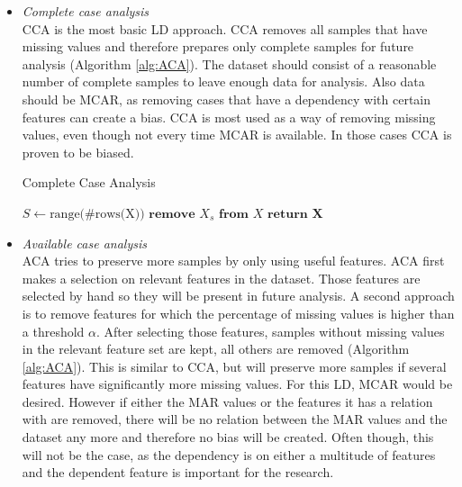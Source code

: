\documentclass[10pt,a4paper]{article}
\begin{document}
	\begin{itemize}
	
	\item \textit{Complete case analysis} \\
	CCA is the most basic LD approach. CCA removes all samples that have missing values and therefore prepares only complete samples for future analysis (Algorithm \ref{alg:ACA}). The dataset should consist of a reasonable number of complete samples to leave enough data for analysis. Also data should be MCAR, as removing cases that have a dependency with certain features can create a bias. CCA is most used as a way of removing missing values, even though not every time MCAR is available\cite{haukoos2007advanced, patrician2002multiple, myrtveit2001analyzing, donders2006gentle}. In those cases CCA is proven to be biased\cite{cartwright2003dealing}.
	
	\begin{algorithm}[H]
		\caption{Complete Case Analysis}\label{alg:CCA}
		\begin{algorithmic}[1]
			\State $S \gets \text{range(\#rows(X))}$ 	
			 					
			 				 			
			\State $\textbf{remove } X_s \textbf{ from } X$ 				
			\EndIf
			\EndFor
			\State $\textbf{return X}$
			\EndProcedure
		\end{algorithmic}
	\end{algorithm}	
	
	\item \textit{Available case analysis} \\
	ACA tries to preserve more samples by only using useful features. ACA first makes a selection on relevant features in the dataset. Those features are selected by hand so they will be present in future analysis. A second approach is to remove features for which the percentage of missing values is higher than a threshold $\alpha$. After selecting those features, samples without missing values in the relevant feature set are kept, all others are removed (Algorithm \ref{alg:ACA}). This is similar to CCA, but will preserve more samples if several features have significantly more missing values. For this LD, MCAR would be desired. However if either the MAR values or the features it has a relation with are removed, there will be no relation between the MAR values and the dataset any more and therefore no bias will be created\cite{haukoos2007advanced, donders2006gentle, patrician2002multiple, myrtveit2001analyzing}. Often though, this will not be the case, as the dependency is on either a multitude of features and the dependent feature is important for the research.
	

\end{itemize}
\end{document}
